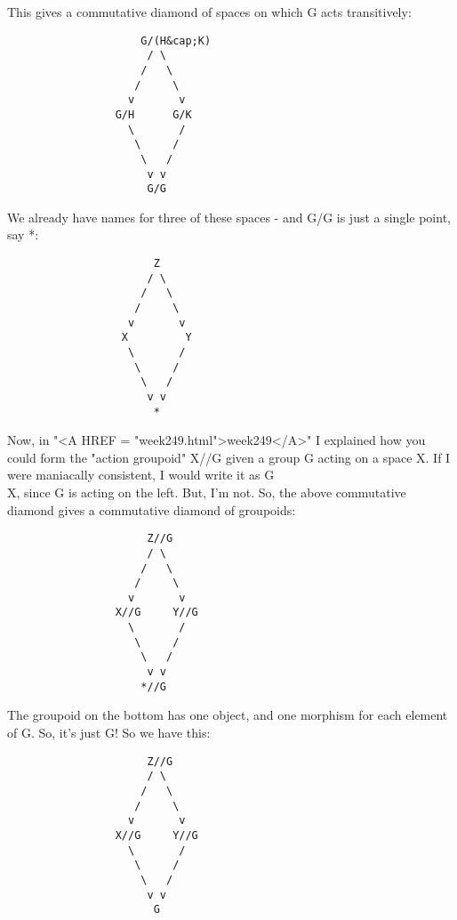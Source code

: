 This gives a commutative diamond of spaces on which G acts 
transitively:

\begin{verbatim}
                     G/(H&cap;K)
                      / \
                     /   \
                    /     \
                   v       v
                 G/H      G/K
                   \       /
                    \     /
                     \   /
                      v v
                      G/G
\end{verbatim}
    
We already have names for three of these spaces - and G/G is just
a single point, say *:

\begin{verbatim}
                       Z
                      / \
                     /   \
                    /     \
                   v       v
                  X         Y
                   \       /
                    \     /
                     \   /
                      v v
                       *
\end{verbatim}
    
Now, in "<A HREF = "week249.html">week249</A>" I explained how you could form the "action groupoid"
X//G given a group G acting on a space X.  If I were maniacally 
consistent, I would write it as G\\X, since G is acting on the left.  
But, I'm not.  So, the above commutative diamond gives a commutative 
diamond of groupoids:

\begin{verbatim}
                      Z//G
                      / \
                     /   \
                    /     \
                   v       v
                 X//G     Y//G
                   \       /
                    \     /
                     \   /
                      v v
                     *//G
\end{verbatim}
    
The groupoid on the bottom has one object, and one morphism for each
element of G.  So, it's just G!  So we have this:

\begin{verbatim}
                      Z//G
                      / \
                     /   \
                    /     \
                   v       v
                 X//G     Y//G
                   \       /
                    \     /
                     \   /
                      v v
                       G
\end{verbatim}
    
